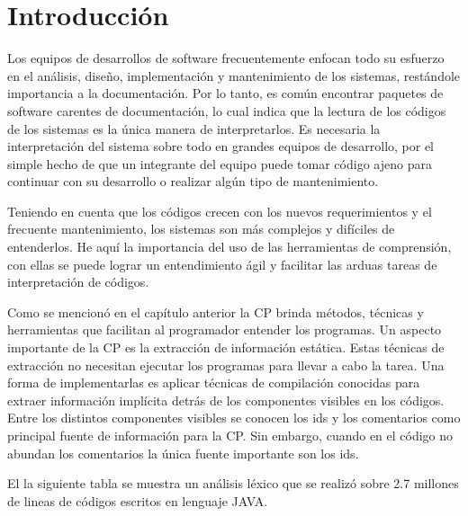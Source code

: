 \documentclass[a4paper,12pt]{report}
\begin{document}
\section{Introducción}

Los equipos de desarrollos de software frecuentemente enfocan todo su esfuerzo en el análisis, diseño, implementación y mantenimiento de los sistemas, restándole importancia a la documentación. Por lo tanto, es común encontrar paquetes de software carentes de documentación, lo cual indica que la lectura de los códigos de los sistemas es la única manera de interpretarlos. Es necesaria la interpretación del sistema sobre todo en grandes equipos de desarrollo, por el simple hecho de que un integrante del equipo puede tomar código ajeno para continuar con su desarrollo o realizar algún tipo de mantenimiento.

Teniendo en cuenta que los códigos crecen con los nuevos requerimientos y el frecuente mantenimiento, los sistemas son más complejos y difíciles de entenderlos. He aquí la importancia del uso de las herramientas de comprensión, con ellas se puede lograr un entendimiento ágil y facilitar las arduas tareas de interpretación de códigos.

Como se mencionó en el capítulo anterior la CP brinda métodos, técnicas y herramientas que facilitan al programador entender los programas. Un aspecto importante de la CP es la extracción de información estática. Estas técnicas de extracción no necesitan ejecutar los programas para llevar a cabo la tarea. Una forma de implementarlas es aplicar técnicas de compilación conocidas para extraer información implícita detrás de los componentes visibles en los códigos.
Entre los distintos componentes visibles se conocen los ids y los comentarios como principal fuente de información para la CP. Sin embargo, cuando en el código no abundan los comentarios la única fuente importante son los ids. 

El la siguiente tabla se muestra un análisis léxico que se realizó sobre 2.7 millones de lineas de códigos escritos en lenguaje JAVA.
\end{document}
